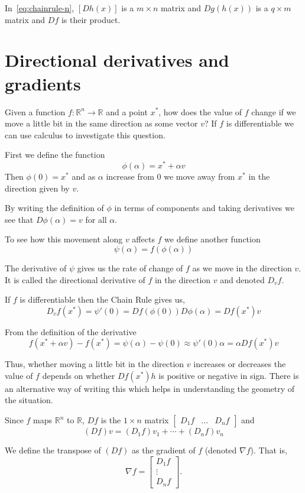 \documentclass[11pt,reqno,openany]{amsbook}
\numberwithin{figure}{chapter}
\numberwithin{equation}{chapter}
\theoremstyle{plain}
\theoremstyle{definition}
\renewcommand{\Re}{\mathbb{R}}
\begin{document}
In~\eqref{eq:chainrule-n}, $[Dh(x)]$ is a $m \times n$
matrix and $Dg(h(x))$ is a $q \times m$ matrix and $Df$ is
their product.

\section{Directional derivatives and gradients}
Given a function $f\colon \Re^n \to \Re$ and a point $x^*$,
how does the value of $f$ change if we move a
little bit in the same direction as some vector $v$? If $f$ is
differentiable we can use calculus to investigate this
question.

First we define the function 
\[\phi(\alpha)=x^* + \alpha v\]
Then $\phi(0)=x^*$ and as $\alpha$ increase from $0$ we move
away from $x^*$ in the direction given by $v$. 

By writing the definition of $\phi$ in terms of components
and taking derivatives we see that $D\phi(\alpha) =
v$ for all $\alpha$.

To see how this movement along $v$ affects $f$ we define another
function
\[\psi(\alpha) = f(\phi(\alpha))\]

The derivative of $\psi$ gives us the rate of change of $f$
as we move in the direction $v$. It is called the
directional derivative of $f$ in the direction $v$ and
denoted $D_vf$. 

If $f$ is differentiable
then the Chain Rule gives us,
\begin{equation}\label{eq:dir-deriv-chain}
D_vf(x^*)=\psi'(0) = Df(\phi(0))D\phi(\alpha)=Df(x^*)v
\end{equation}

From the definition of the derivative
\begin{equation}\label{eq:lin-approx-dir}
f(x^*+\alpha v) - f(x^*) = \psi(\alpha) - \psi(0) \approx
\psi'(0)\alpha = \alpha Df(x^*)v
\end{equation}

Thus, whether moving a little bit in the direction $v$
increases or decreases the value of $f$ depends on whether
$Df(x^*)h$ is positive or negative in sign. There is an
alternative way of writing this which helps in understanding
the geometry of the situation.

Since $f$ maps $\Re^n$ to $\Re$, $Df$ is the $1 \times n$
matrix $\begin{bmatrix} D_1f & \hdots & D_n f\end{bmatrix}$
and 
\[(Df)v = (D_1f) v_1+\cdots+(D_nf) v_n\]

We define the transpose of $(Df)$ as the gradient of $f$
(denoted $\nabla f$). That is,
\[\nabla f = \begin{bmatrix}
D_1 f\\
\vdots\\
D_n f
\end{bmatrix}.\]
\end{document}
